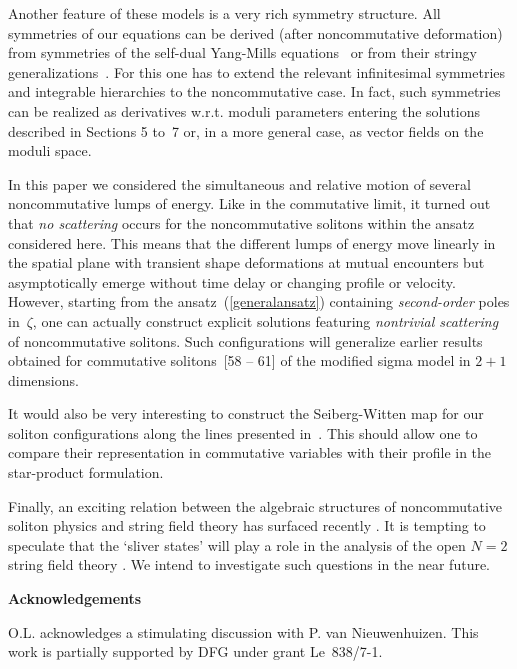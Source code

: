 \documentclass[a4paper,11pt]{article}
\numberwithin{equation}{section}
\begin{document}
Another feature of these models is a very rich symmetry structure.
All symmetries of our equations can be derived
(after noncommutative deformation) from symmetries of the self-dual Yang-Mills
equations~\cite{PP,po} or from their stringy generalizations~\cite{ivle,pole3}.
For this one has to extend the relevant infinitesimal symmetries and integrable
hierarchies to the noncommutative case. In fact, such
symmetries can be realized as derivatives w.r.t. moduli parameters
entering the solutions described in Sections 5 to~7 or, in a more general case,
as vector fields on the moduli space.

In this paper we considered the simultaneous and relative motion of several
noncommutative lumps of energy. Like in the commutative limit,
it turned out that {\it no scattering\/} occurs for the noncommutative
solitons within the ansatz considered here. This means that the different
lumps of energy move linearly in the spatial plane with transient shape
deformations at mutual encounters but asymptotically emerge without
time delay or changing profile or velocity.
However, starting from the ansatz~(\ref{generalansatz})
containing {\it second-order\/} poles in~$\zeta$, one can actually construct explicit
solutions featuring {\it nontrivial scattering\/} of noncommutative solitons.
Such configurations will generalize earlier results obtained for commutative
solitons~[58 -- 61] of the modified sigma model in $2{+}1$ dimensions.

It would also be very interesting to construct the Seiberg-Witten map for
our soliton configurations along the lines presented in~\cite{hashi}.
This should allow one to compare their representation in commutative
variables with their profile in the star-product formulation.

Finally, an exciting relation between the algebraic structures of
noncommutative soliton physics and string field theory has surfaced recently
\cite{kost,rast,gross4}. It is tempting to speculate that the `sliver states'
will play a role in the analysis of the open $N{=}2$ string field theory
\cite{berk,pole3}. We intend to investigate such questions in the near future.


\bigskip
\noindent
{\large{\bf Acknowledgements}}

\smallskip
\noindent
O.L. acknowledges a stimulating discussion with P. van Nieuwenhuizen.
This work is partially supported by DFG under grant Le~838/7-1.

\bigskip

\setcounter{section}{0}
\renewcommand{\thesection}{\Alph{section}}
\end{document}
